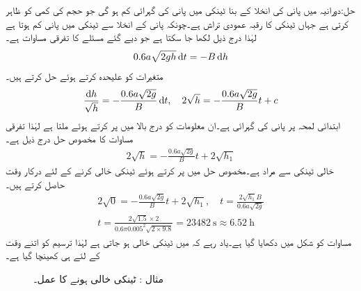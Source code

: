 حل:دورانیہ  میں پانی کی انخلا کے بنا ٹینکی میں پانی کی گہرائی  کم ہو گی جو  حجم کی کمی کو ظاہر کرتی ہے جہاں  ٹینکی کا رقبہ عمودی تراش ہے۔چونکہ پانی کے انخلا سے ٹینکی میں پانی کم ہوتا ہے لہٰذا درج ذیل لکھا جا سکتا ہے جو دیے گئے مسئلے کا تفرقی مساوات ہے۔
\begin{align}
0.6a\sqrt{2gh} \dif t=-B\dif h
\end{align}
متغیرات کو علیحدہ کرتے ہوئے حل کرتے ہیں۔
\begin{align*}
\frac{\dif h}{\sqrt{h}}=-\frac{0.6a \sqrt{2g}}{B} \dif t,\quad 2\sqrt{h}=-\frac{0.6a \sqrt{2g}}{B} t+c
\end{align*}
ابتدائی لمحہ  پر پانی کی گہرائی  ہے۔ان معلومات کو درج بالا میں پر کرتے ہوئے  ملتا ہے لہٰذا تفرقی مساوات کا مخصوص حل درج ذیل ہے۔
\begin{align}\label{مساوات_سادہ_اول_ٹاری_سلی_ٹینکی_خالی}
 2\sqrt{h}=-\frac{0.6a \sqrt{2g}}{B} t+ 2\sqrt{h_1}
\end{align}
خالی ٹینکی سے مراد  ہے۔مخصوص حل میں  پر کرتے ہوئے ٹینکی خالی کرنے کے لئے درکار وقت حاصل کرتے ہیں۔
\begin{align*}
 2\sqrt{0}=-\frac{0.6a \sqrt{2g}}{B} t+ 2\sqrt{h_1}, \quad t=\frac{2\sqrt{h_1} B}{0.6a \sqrt{2g}}\\
t=\frac{2\sqrt{1.5} \times 2}{0.6\pi 0.005^2 \sqrt{2\times 9.8}}=\SI{23482}{\second} \approx \SI{6.52}{\hour}
\end{align*}
مساوات  کو شکل  میں دکھایا گیا ہے۔یاد رہے کہ  میں ٹینکی خالی ہو جاتی ہے لہٰذا ترسیم کو اتنے وقت کے لئے ہی کھینچا گیا ہے۔
\begin{figure}
\centering
{}
\caption{مثال : ٹینکی خالی ہونے کا عمل۔}
\label{شکل_مثال_سادہ_اول_ٹاری_سلی_خالی}
\end{figure}

